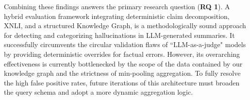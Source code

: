 Combining these findings answers the primary research question (\textbf{RQ 1}). A hybrid evaluation framework integrating deterministic claim decomposition, XNLI, and a structured Knowledge Graph, is a methodologically sound approach for detecting and categorizing hallucinations in LLM-generated summaries. It successfully circumvents the circular validation flaws of ``LLM-as-a-judge" models by providing deterministic overrides for factual errors. However, its overarching effectiveness is currently bottlenecked by the scope of the data contained by our knowledge graph and the strictness of min-pooling aggregation. To fully resolve the high false positive rates, future iterations of this architecture must broaden the query schema and adopt a more dynamic aggregation logic.